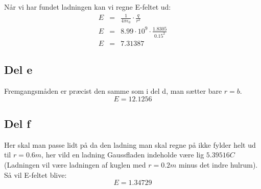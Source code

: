Når vi har fundet ladningen kan vi regne E-feltet ud:
\begin{eqnarray}
	E &=& \frac{1}{4\pi \epsilon _0} \cdot \frac{q}{r^2} \\
	E &=& 8.99\cdot 10^9 \cdot \frac{1.8305}{0.15^2} \\
	E &=& 7.31387 
\end{eqnarray}

\subsection{Del e} %
\label{sub:del_e}
Fremgangsmåden er præcist den samme som i del d, man sætter bare $r = b$.
\begin{equation}
	E = 12.1256
\end{equation}

\subsection{Del f} %
\label{sub:del_f}
Her skal man passe lidt på da den ladning man skal regne på ikke fylder helt ud til $r = 0.6m$, her vild en ladning Gaussfladen indeholde være lig $5.39516C$ (Ladningen vil være ladningen af kuglen med $r = 0.2m$ minus det indre hulrum). Så vil E-feltet blive:
\begin{equation}
	E = 1.34729
\end{equation} 
